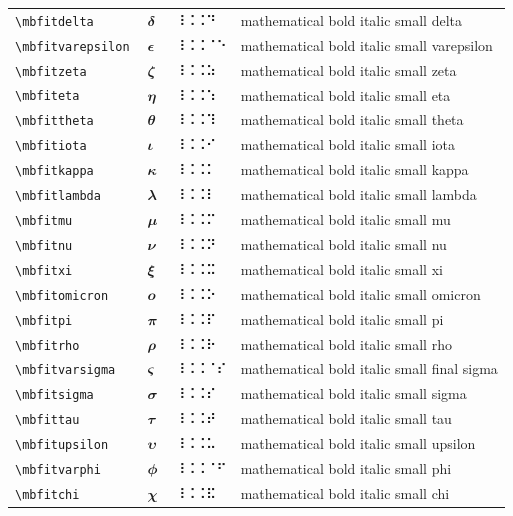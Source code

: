 \documentclass[oneside]{article}
\begin{document}
\begin{longtable}{llll}
\verb|\mbfitdelta| & $\mbfitdelta$ &  ⠸⠨⠨⠙  & {mathematical bold italic small delta} \\[2ex]
\verb|\mbfitvarepsilon| & $\mbfitvarepsilon$ &  ⠸⠨⠨⠈⠑  & {mathematical bold italic small varepsilon} \\[2ex]
\verb|\mbfitzeta| & $\mbfitzeta$ &  ⠸⠨⠨⠵  & {mathematical bold italic small zeta} \\[2ex]
\verb|\mbfiteta| & $\mbfiteta$ &  ⠸⠨⠨⠱  & {mathematical bold italic small eta} \\[2ex]
\verb|\mbfittheta| & $\mbfittheta$ &  ⠸⠨⠨⠹  & {mathematical bold italic small theta} \\[2ex]
\verb|\mbfitiota| & $\mbfitiota$ &  ⠸⠨⠨⠊  & {mathematical bold italic small iota} \\[2ex]
\verb|\mbfitkappa| & $\mbfitkappa$ &  ⠸⠨⠨⠅  & {mathematical bold italic small kappa} \\[2ex]
\verb|\mbfitlambda| & $\mbfitlambda$ &  ⠸⠨⠨⠇  & {mathematical bold italic small lambda} \\[2ex]
\verb|\mbfitmu| & $\mbfitmu$ &  ⠸⠨⠨⠍  & {mathematical bold italic small mu} \\[2ex]
\verb|\mbfitnu| & $\mbfitnu$ &  ⠸⠨⠨⠝  & {mathematical bold italic small nu} \\[2ex]
\verb|\mbfitxi| & $\mbfitxi$ &  ⠸⠨⠨⠭  & {mathematical bold italic small xi} \\[2ex]
\verb|\mbfitomicron| & $\mbfitomicron$ &  ⠸⠨⠨⠕  & {mathematical bold italic small omicron} \\[2ex]
\verb|\mbfitpi| & $\mbfitpi$ &  ⠸⠨⠨⠏  & {mathematical bold italic small pi} \\[2ex]
\verb|\mbfitrho| & $\mbfitrho$ &  ⠸⠨⠨⠗  & {mathematical bold italic small rho} \\[2ex]
\verb|\mbfitvarsigma| & $\mbfitvarsigma$ &  ⠸⠨⠨⠈⠎  & {mathematical bold italic small final sigma} \\[2ex]
\verb|\mbfitsigma| & $\mbfitsigma$ &  ⠸⠨⠨⠎  & {mathematical bold italic small sigma} \\[2ex]
\verb|\mbfittau| & $\mbfittau$ &  ⠸⠨⠨⠞  & {mathematical bold italic small tau} \\[2ex]
\verb|\mbfitupsilon| & $\mbfitupsilon$ &  ⠸⠨⠨⠥  & {mathematical bold italic small upsilon} \\[2ex]
\verb|\mbfitvarphi| & $\mbfitvarphi$ &  ⠸⠨⠨⠈⠋  & {mathematical bold italic small phi} \\[2ex]
\verb|\mbfitchi| & $\mbfitchi$ &  ⠸⠨⠨⠯  & {mathematical bold italic small chi} \\[2ex]

\end{longtable}
\end{document}
